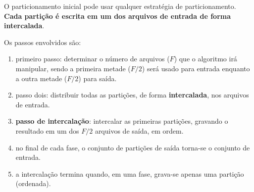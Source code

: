 O particionamento inicial pode usar qualquer estratégia de particionamento.
{\bf Cada partição é escrita em um dos arquivos de entrada de forma intercalada}.

Os passos envolvidos são:
\begin{enumerate}
\item primeiro passo: determinar o número de arquivos ($F$) que o algoritmo irá
manipular, sendo a primeira metade ($F/2$) será usado para entrada enquanto
a outra metade ($F/2$) para saída.

\item passo dois: distribuir todas as partições, de forma {\bf intercalada},
nos arquivos de entrada.

\item {\bf passo de intercalação}: intercalar as primeiras partições,
gravando o resultado em um dos $F/2$ arquivos de saída, em ordem.

\item no final de cada fase, o conjunto de partições de saída
torna-se o conjunto de entrada.

\item a intercalação termina quando, em uma fase, grava-se apenas uma partição
(ordenada).
\end{enumerate}

%
%
%
%
%
%
%
%
%
%

